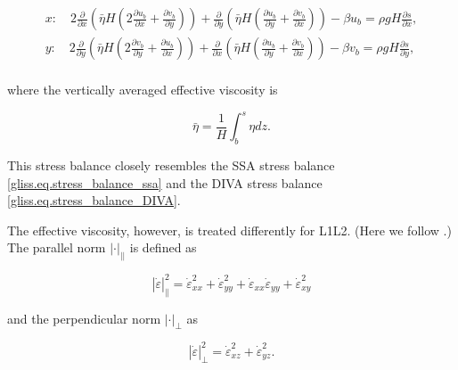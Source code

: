{\begin{equation}
  \label{gliss.eq.stress_balance_tau_integrated2}
  \begin{split}
    x: \quad 2 \frac{\partial }{\partial x} \left( \bar{\eta}H \left( 2 \frac{\partial u_b}{\partial x} + \frac{\partial v_b}{\partial y} \right) \right)
             + \frac{\partial }{\partial y} \left( \bar{\eta}H \left(   \frac{\partial u_b}{\partial y} + \frac{\partial v_b}{\partial x} \right) \right)
             - \beta u_b = \rho g H \frac{\partial s}{\partial x}, \\
    y: \quad 2 \frac{\partial }{\partial y} \left( \bar{\eta}H \left( 2 \frac{\partial v_b}{\partial y} + \frac{\partial u_b}{\partial x} \right) \right)
             + \frac{\partial }{\partial x} \left( \bar{\eta}H \left(   \frac{\partial u_b}{\partial y} + \frac{\partial v_b}{\partial x} \right) \right)
             - \beta v_b = \rho g H \frac{\partial s}{\partial y}, \\
  \end{split}
\end{equation}

\noindent
where the vertically averaged effective viscosity is

\begin{equation}
  \bar{\eta} = \frac{1}{H} \int_b^s {\eta dz}.
\end{equation}

\noindent
This stress balance closely resembles the SSA stress balance \eqref{gliss.eq.stress_balance_ssa}
and the DIVA stress balance \eqref{gliss.eq.stress_balance_DIVA}.

The effective viscosity, however, is treated differently for L1L2.
(Here we follow \citet{Perego2012}.)
The parallel norm $\left| \cdot \right|_{||}$ is defined as

\begin{equation}
  \label{gliss.eq.L1L2_parallel_norm}
  \left| {\dot{\varepsilon }} \right|_{\parallel}^{2} = 
  \dot{\varepsilon }_{xx}^{2} + \dot{\varepsilon }_{yy}^{2} + {{\dot{\varepsilon }}_{xx}}{{\dot{\varepsilon }}_{yy}} + \dot{\varepsilon }_{xy}^{2}
\end{equation}

\noindent
and the perpendicular norm $\left| \cdot \right|_{\perp}$ as

\begin{equation}
  \label{gliss.eq.L1L2_perp_norm}
  \left| {\dot{\varepsilon }} \right|_{\perp}^{2} = 
  \dot{\varepsilon }_{xz}^{2} + \dot{\varepsilon }_{yz}^{2}.
\end{equation}

}
